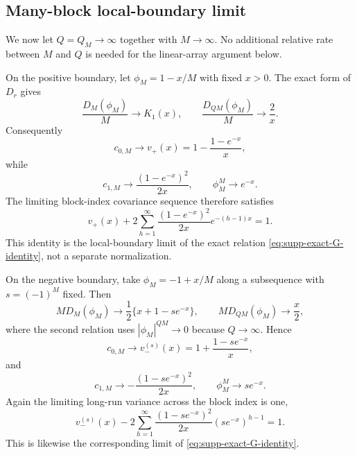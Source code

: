 \documentclass[12pt]{article}
\theoremstyle{remark}
\begin{document}
\subsection{Many-block local-boundary limit}
We now let $Q=Q_M\to\infty$ together with $M\to\infty$. No additional relative rate between $M$ and $Q$ is needed for the linear-array argument below.

On the positive boundary, let $\phi_M=1-x/M$ with fixed $x>0$. The exact form of $D_r$ gives
\begin{equation*}
\frac{D_M(\phi_M)}{M}\longrightarrow
K_1(x),
\qquad
\frac{D_{QM}(\phi_M)}{M}\longrightarrow\frac2x.
\end{equation*}
Consequently
\begin{equation}
c_{0,M}\longrightarrow
v_+(x)=1-\frac{1-e^{-x}}{x},
\label{eq:supp-manyQ-vplus}
\end{equation}
while
\begin{equation*}
c_{1,M}\longrightarrow
\frac{(1-e^{-x})^2}{2x},
\qquad
\phi_M^M\longrightarrow e^{-x}.
\end{equation*}
The limiting block-index covariance sequence therefore satisfies
\begin{equation*}
v_+(x)
+2\sum_{h=1}^{\infty}
\frac{(1-e^{-x})^2}{2x}e^{-(h-1)x}
=1.
\end{equation*}
This identity is the local-boundary limit of the exact relation \eqref{eq:supp-exact-G-identity}, not a separate normalization.

On the negative boundary, take $\phi_M=-1+x/M$ along a subsequence with $s=(-1)^M$ fixed. Then
\begin{equation*}
MD_M(\phi_M)\longrightarrow
\frac12\{x+1-se^{-x}\},
\qquad
MD_{QM}(\phi_M)\longrightarrow\frac x2,
\end{equation*}
where the second relation uses $|\phi_M|^{QM}\to0$ because $Q\to\infty$. Hence
\begin{equation}
c_{0,M}\longrightarrow
v_-^{(s)}(x)=1+\frac{1-se^{-x}}{x},
\label{eq:supp-manyQ-vminus}
\end{equation}
and
\begin{equation*}
c_{1,M}\longrightarrow
-\frac{(1-se^{-x})^2}{2x},
\qquad
\phi_M^M\longrightarrow se^{-x}.
\end{equation*}
Again the limiting long-run variance across the block index is one,
\begin{equation*}
v_-^{(s)}(x)
-2\sum_{h=1}^{\infty}
\frac{(1-se^{-x})^2}{2x}(se^{-x})^{h-1}
=1.
\end{equation*}
This is likewise the corresponding limit of \eqref{eq:supp-exact-G-identity}.
\end{document}
